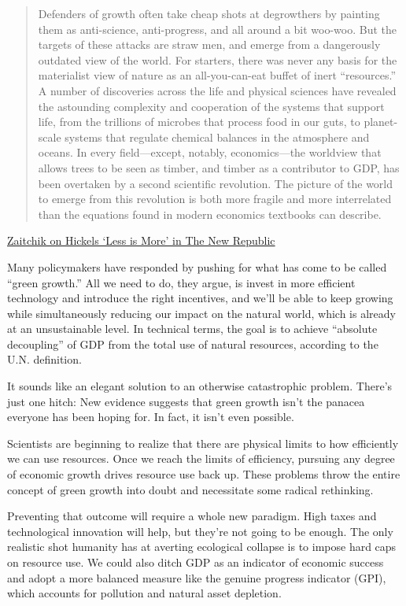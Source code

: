 \documentclass[
]{book}
\begin{document}
\begin{quote}
Defenders of growth often take cheap shots at degrowthers by painting them as anti-science, anti-progress, and all around a bit woo-woo. But the targets of these attacks are straw men, and emerge from a dangerously outdated view of the world. For starters, there was never any basis for the materialist view of nature as an all-you-can-eat buffet of inert ``resources.'' A number of discoveries across the life and physical sciences have revealed the astounding complexity and cooperation of the systems that support life, from the trillions of microbes that process food in our guts, to planet-scale systems that regulate chemical balances in the atmosphere and oceans. In every field---except, notably, economics---the worldview that allows trees to be seen as timber, and timber as a contributor to GDP, has been overtaken by a second scientific revolution. The picture of the world to emerge from this revolution is both more fragile and more interrelated than the equations found in modern economics textbooks can describe.
\end{quote}

\href{https://newrepublic.com/article/160692/less-is-more-degrowth-climate-change-book-review}{Zaitchik on Hickels `Less is More' in The New Republic}

Many policymakers have responded by pushing for what has come to be called ``green growth.'' All we need to do, they argue, is invest in more efficient technology and introduce the right incentives, and we'll be able to keep growing while simultaneously reducing our impact on the natural world, which is already at an unsustainable level. In technical terms, the goal is to achieve ``absolute decoupling'' of GDP from the total use of natural resources, according to the U.N. definition.

It sounds like an elegant solution to an otherwise catastrophic problem. There's just one hitch: New evidence suggests that green growth isn't the panacea everyone has been hoping for. In fact, it isn't even possible.

Scientists are beginning to realize that there are physical limits to how efficiently we can use resources.
Once we reach the limits of efficiency, pursuing any degree of economic growth drives resource use back up.
These problems throw the entire concept of green growth into doubt and necessitate some radical rethinking.

Preventing that outcome will require a whole new paradigm. High taxes and technological innovation will help, but they're not going to be enough. The only realistic shot humanity has at averting ecological collapse is to impose hard caps on resource use.
We could also ditch GDP as an indicator of economic success and adopt a more balanced measure like the genuine progress indicator (GPI), which accounts for pollution and natural asset depletion.
\end{document}
